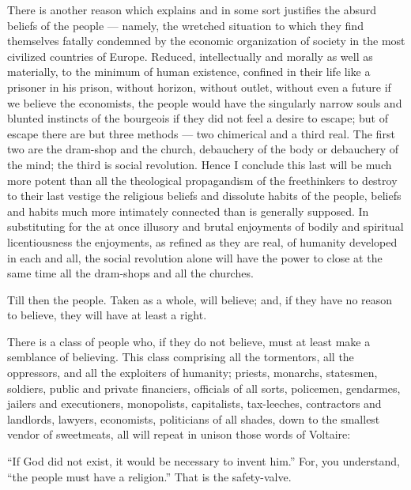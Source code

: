 \documentclass[12pt]{report}
\begin{document}
There is another reason which explains and in some sort justifies the absurd beliefs of the people — namely, the wretched situation to which they find themselves fatally condemned by the economic organization of society in the most civilized countries of Europe. Reduced, intellectually and morally as well as materially, to the minimum of human existence, confined in their life like a prisoner in his prison, without horizon, without outlet, without even a future if we believe the economists, the people would have the singularly narrow souls and blunted instincts of the bourgeois if they did not feel a desire to escape; but of escape there are but three methods — two chimerical and a third real. The first two are the dram-shop and the church, debauchery of the body or debauchery of the mind; the third is social revolution. Hence I conclude this last will be much more potent than all the theological propagandism of the freethinkers to destroy to their last vestige the religious beliefs and dissolute habits of the people, beliefs and habits much more intimately connected than is generally supposed. In substituting for the at once illusory and brutal enjoyments of bodily and spiritual licentiousness the enjoyments, as refined as they are real, of humanity developed in each and all, the social revolution alone will have the power to close at the same time all the dram-shops and all the churches.


Till then the people. Taken as a whole, will believe; and, if they have no reason to believe, they will have at least a right.


There is a class of people who, if they do not believe, must at least make a semblance of believing. This class comprising all the tormentors, all the oppressors, and all the exploiters of humanity; priests, monarchs, statesmen, soldiers, public and private financiers, officials of all sorts, policemen, gendarmes, jailers and executioners, monopolists, capitalists, tax-leeches, contractors and landlords, lawyers, economists, politicians of all shades, down to the smallest vendor of sweetmeats, all will repeat in unison those words of Voltaire:


“If God did not exist, it would be necessary to invent him.” For, you understand, “the people must have a religion.” That is the safety-valve.
\end{document}
